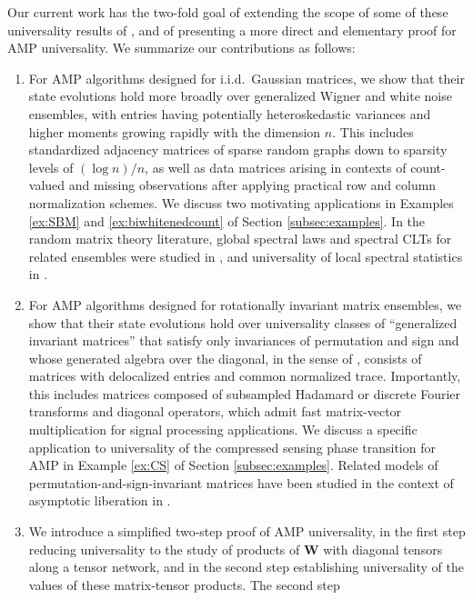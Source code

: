 \documentclass[10pt,reqno]{amsart}
\def\W{\mathbf{W}}
\begin{document}
Our current work has the two-fold goal of extending the scope of some of these
universality results of
\cite{bayati2015universality,chen2021universality,dudeja2022universality},
and of presenting a more direct and elementary proof for AMP universality. We summarize our
contributions as follows:
\begin{enumerate}
\item For AMP algorithms designed for i.i.d.\ Gaussian matrices, we show that their state
evolutions hold more broadly over generalized Wigner and white
noise ensembles, with entries having potentially heteroskedastic variances and
higher moments growing rapidly with the dimension $n$.
This includes standardized adjacency matrices
of sparse random graphs down to sparsity levels of $(\log n)/n$, as well as data
matrices arising in contexts of count-valued and missing observations after
applying practical row and column normalization schemes. We discuss two
motivating applications in Examples \ref{ex:SBM} and \ref{ex:biwhitenedcount}
of Section \ref{subsec:examples}. In the random matrix theory literature,
global spectral laws and spectral CLTs for related ensembles
were studied in \cite{anderson2006clt}, and universality of local
spectral statistics in \cite{erdHos2012bulk,erdHos2012rigidity}.
\item For AMP algorithms designed for rotationally invariant matrix
ensembles, we show that their state evolutions hold over universality classes of
``generalized invariant matrices''
that satisfy only invariances of permutation and sign and 
whose generated algebra over the diagonal, in the sense of
\cite{au2021freeness}, consists of matrices with delocalized entries and common
normalized trace.
Importantly, this includes matrices composed of subsampled Hadamard
or discrete Fourier transforms and diagonal operators, which admit fast
matrix-vector multiplication for signal processing applications. We discuss a
specific application to universality of the compressed sensing
phase transition for AMP \cite{donoho2009observed,bayati2015universality}
in Example \ref{ex:CS} of Section \ref{subsec:examples}. Related models of
permutation-and-sign-invariant matrices have been studied in the context of
asymptotic liberation in \cite{anderson2014asymptotically}.
\item We introduce a simplified two-step proof of AMP universality, in the 
first step reducing universality to the study of products of $\W$ with
diagonal tensors along a tensor network, and in the second step establishing
universality of the values of these matrix-tensor products. The second step

\end{enumerate}
\end{document}
